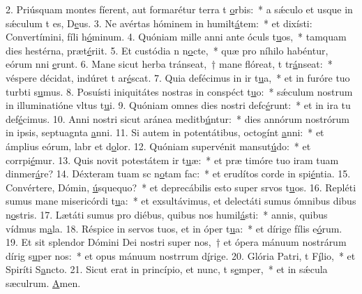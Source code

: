 2. Priúsquam montes fíerent, aut formarétur terra t \uline{o}rbis:~* a sǽculo et usque in sǽculum t es, D\uline{e}us.
3. Ne avértas hóminem in humilt\uline{á}tem:~* et dixísti: Convertímini, fíli h\uline{ó}minum.
4. Quóniam mille anni ante óculs t\uline{u}os,~* tamquam dies hestérna,  præt\uline{é}riit.
5. Et custódia n n\uline{o}cte,~* quæ pro níhilo habéntur, eórum nni \uline{e}runt.
6. Mane sicut herba tránseat,~† mane flóreat, t tr\uline{á}nseat:~* véspere décidat, indúret t ar\uline{é}scat.
7. Quia defécimus in ir t\uline{u}a,~* et in furóre tuo turbti s\uline{u}mus.
8. Posuísti iniquitátes nostras in conspéct t\uline{u}o:~* sǽculum nostrum in illuminatióne vltus t\uline{u}i.
9. Quóniam omnes dies nostri defc\uline{é}runt:~* et in ira tu def\uline{é}cimus.
10. Anni nostri sicut aránea meditb\uline{ú}ntur:~* dies annórum nostrórum in ipsis, septuagnta \uline{a}nni.
11. Si autem in potentátibus, octogínt \uline{a}nni:~* et ámplius eórum, labr et d\uline{o}lor.
12. Quóniam supervénit mansut\uline{ú}do:~* et corrpi\uline{é}mur.
13. Quis novit potestátem ir t\uline{u}æ:~* et præ timóre tuo iram tuam dinmer\uline{á}re?
14. Déxteram tuam sc n\uline{o}tam fac:~* et erudítos corde in spi\uline{é}ntia.
15. Convértere, Dómin, \uline{ú}squequo?~* et deprecábilis esto super srvos t\uline{u}os.
16. Repléti sumus mane misericórdi t\uline{u}a:~* et exsultávimus, et delectáti sumus ómnibus dibus n\uline{o}stris.
17. Lætáti sumus pro diébus, quibus nos humil\uline{á}sti:~* annis, quibus vídmus m\uline{a}la.
18. Réspice in servos tuos, et in óper t\uline{u}a:~* et dírige fílis e\uline{ó}rum.
19. Et sit splendor Dómini Dei nostri super nos,~† et ópera mánuum nostrárum dírig s\uline{u}per nos:~* et opus mánuum nostrrum d\uline{í}rige.
20. Glória Patri, t F\uline{í}lio,~* et Spiríti S\uline{a}ncto.
21. Sicut erat in princípio, et nunc, t s\uline{e}mper,~* et in sǽcula sæculrum. \uline{A}men.
